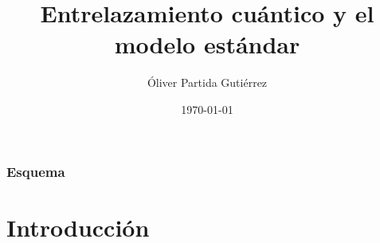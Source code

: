 \documentclass{beamer}
\title[Entrelazamiento cuántico y el modelo estándar]{Entrelazamiento cuántico y el modelo estándar} %
\author{Óliver Partida Gutiérrez} %
\institute[UNED] %
{
U.N.E.D \\ %
\medskip

}
\date{\today} %
\begin{document}
\begin{frame}
\titlepage %
\end{frame}

\begin{frame}
\frametitle{Esquema} %
\tableofcontents %
\end{frame}


\section{Introducción} %



\end{document}
